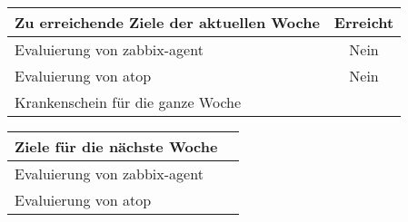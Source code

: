 \begin{tabularx}{\textwidth}{Xc}
    \arrayrulecolor{OliveGreen}
    \toprule
    {\bfseries Zu erreichende Ziele der aktuellen Woche} & {\bfseries Erreicht} \\
    \midrule[2pt]
    Evaluierung von zabbix-agent                         &Nein                  \\
    \rowcolor{OliveGreen!15}
    Evaluierung von atop                                 &Nein                  \\
    \rowcolor{White}
    Krankenschein für die ganze Woche                    &                      \\
    \bottomrule[2pt]
\end{tabularx}
%
\vspace{1cm}
%
\begin{tabularx}{\textwidth}{Xc}
    \arrayrulecolor{OliveGreen}
    \toprule
    {\bfseries Ziele für die nächste Woche}              &                      \\
    \midrule[2pt]
    Evaluierung von zabbix-agent                         &                      \\
    \rowcolor{OliveGreen!15}
    Evaluierung von atop                                 &                      \\
\end{tabularx}
